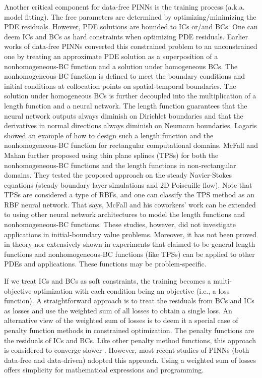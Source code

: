 Another critical component for data-free PINNs is the training process (a.k.a. model fitting).
The free parameters are determined by optimizing/minimizing the PDE residuals.
However, PDE solutions are bounded to ICs or/and BCs.
One can deem ICs and BCs as hard constraints when optimizing PDE residuals.
Earlier works of data-free PINNs converted this constrained problem to an unconstrained one by treating an approximate PDE solution as a superposition of a nonhomogeneous-BC function and a solution under homogeneous BCs.
The nonhomogeneous-BC function is defined to meet the boundary conditions and initial conditions at collocation points on spatial-temporal boundaries.
The solution under homogeneous BCs is further decoupled into the multiplication of a length function and a neural network. 
The length function guarantees that the neural network outputs always diminish on Dirichlet boundaries and that the derivatives in normal directions always diminish on Neumann boundaries.
Lagaris \cite{lagaris_artificial_1998} showed an example of how to design such a length function and the nonhomogeneous-BC function for rectangular computational domains.
McFall and Mahan \cite{McFall2009} further proposed using thin plane splines (TPSs) for both the nonhomogeneous-BC functions and the length functions in non-rectangular domains.
They tested the proposed approach on the steady Navier-Stokes equations (steady boundary layer simulations and 2D Poiseuille flow). 
Note that TPSs are considered a type of RBFs, and one can classify the TPS method as an RBF neural network.
That says, McFall and his coworkers' work can be extended to using other neural network architectures to model the length functions and nonhomogeneous-BC functions.
These studies, however, did not investigate applications in initial-boundary value problems.
Moreover, it has not been proved in theory nor extensively shown in experiments that claimed-to-be general length functions and nonhomogeneous-BC functions (like TPSs) can be applied to other PDEs and applications.
These functions may be problem-specific.

If we treat ICs and BCs as soft constraints, the training becomes a multi-objective optimization with each condition being an objective (i.e., a loss function).
A straightforward approach is to treat the residuals from BCs and ICs as losses and use the weighted sum of all losses to obtain a single loss. 
An alternative view of the weighted sum of losses is to deem it a special case of penalty function methods in constrained optimization.
The penalty functions are the residuals of ICs and BCs.
Like other penalty method functions, this approach is considered to converge slower \cite{rudd_constrained_2014}.
However, most recent studies of PINNs (both data-free and data-driven) adopted this approach.
Using a weighted sum of losses offers simplicity for mathematical expressions and programming.

